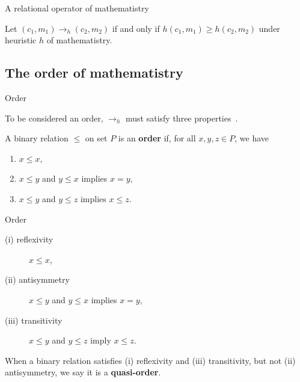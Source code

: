 \documentclass{beamer}
\begin{document}

\begin{frame}{A relational operator of mathematistry}

\begin{definition}\label{def:om}
Let $(c_1, m_1) \to_h (c_2, m_2)$ if and only if $h(c_1, m_1) \geqslant h(c_2, m_2)$ under heuristic $h$ of mathematistry.
\end{definition}



\end{frame}


\subsection{The order of mathematistry}


\begin{frame}{Order}

To be considered an order, $\to_h$ must satisfy three properties~\cite{davey_introduction_2002-1}.

\vspace{1.5cm}

\begin{defn}\label{def:order}
A binary relation $\leqslant$ on set $P$ is an \textbf{order} if, for all $x, y, z \in P$, we have
\begin{enumerate}[label=(\roman*)]
    \item $x \leqslant x$,
    \item $x \leqslant y$ and $y \leqslant x$ implies $x = y$,
    \item $x \leqslant y$ and $y \leqslant z$ implies $x \leqslant z$.
\end{enumerate}

\end{defn}

\end{frame}



\begin{frame}{Order}

\begin{description}%
    \item[(i) reflexivity] $x \leqslant x$,
    \item[(ii) antisymmetry] $x \leqslant y$ and $y \leqslant x$ implies $x = y$,
    \item[(iii) transitivity] $x \leqslant y$ and $y \leqslant z$ imply $x \leqslant z$.
\end{description}

\vspace{1.5cm}

When a binary relation satisfies (i) reflexivity and (iii) transitivity, but not (ii) antisymmetry, we say it is a \textbf{quasi-order}.


 \end{frame}
\end{document}
